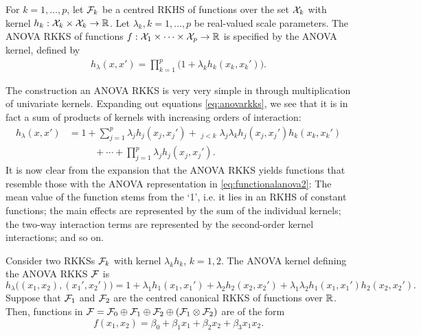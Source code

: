 \begin{definition}
  For $k=1,\dots,p$, let ${\mathcal F}_k$ be a centred RKHS of functions over the set ${\mathcal X}_k$ with kernel $h_k:{\mathcal X}_k\times{\mathcal X}_k\to\mathbb{R}$. 
  Let $\lambda_k, k=1,\dots,p$ be real-valued scale parameters.
  The ANOVA RKKS of functions $f:{\mathcal X}_1\times\cdots\times{\mathcal X}_p\to\mathbb{R}$ is specified by the ANOVA kernel, defined by
  \begin{align}\label{eq:anovarkks}
    h_\lambda(x,x') = \prod_{k=1}^p \big( 1 + \lambda_k h_k(x_k,x_k') \big).
  \end{align}
\end{definition}

The construction an ANOVA RKKS is very very simple in through multiplication of univariate kernels.
Expanding out equations \cref{eq:anovarkks}, we see that it is in fact a sum of products of kernels with increasing orders of interaction:
\begin{align*}
  h_\lambda(x,x') 
  &= 1 + \sum_{j=1}^p \lambda_j h_j(x_j,x_j') + \mathop{\sum_{j,k=1}^p}_{j<k} \lambda_j\lambda_k h_j(x_j,x_j')h_k(x_k,x_k') \\
  &\phantom{==} + \cdots + \prod_{j=1}^p \lambda_j h_j(x_j,x_j').
\end{align*}
It is now clear from the expansion that the ANOVA RKKS yields functions that resemble those with the ANOVA representation in \cref{eq:functionalanova2}:
The mean value of the function stems from the `1', i.e. it lies in an RKHS of constant functions; the main effects are represented by the sum of the individual kernels; the two-way interaction terms are represented by the second-order kernel interactions; and so on.


\begin{example}
  Consider two RKKSs ${\mathcal F}_k$ with kernel $\lambda_k h_k$, $k=1,2$.
  The ANOVA kernel defining the ANOVA RKKS ${\mathcal F}$ is
  \[
    h_\lambda\big((x_1,x_2),(x_1',x_2') \big) = 1 + \lambda_1 h_1(x_1,x_1') + \lambda_2 h_2(x_2,x_2') + \lambda_1\lambda_2 h_1(x_1,x_1')h_2(x_2,x_2').
  \]  
  Suppose that ${\mathcal F}_1$ and ${\mathcal F}_2$ are the centred canonical RKKS of functions over $\mathbb{R}$.
  Then, functions in ${\mathcal F} = {\mathcal F}_0 \oplus {\mathcal F}_1 \oplus {\mathcal F}_2 \oplus ({\mathcal F}_1 \otimes {\mathcal F}_2)$ are of the form
  \[
    f(x_1,x_2) = \beta_0 + \beta_1x_1 + \beta_2x_2 + \beta_3x_1x_2.
  \]
\end{example}

